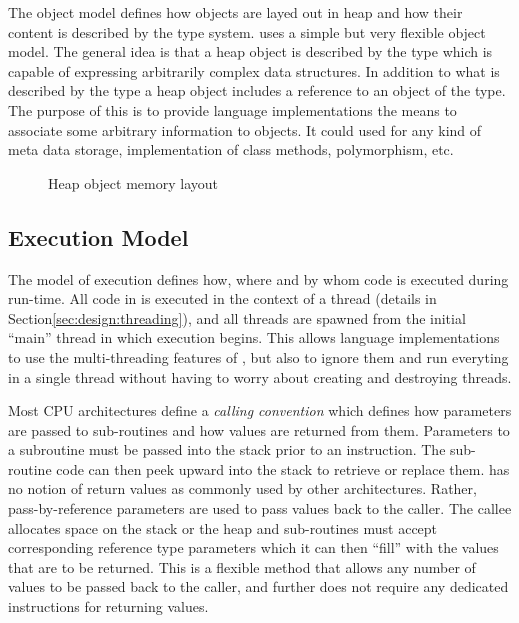 The object model defines how objects are layed out in heap and how their content
is described by the type system. \thename{} uses a simple but very flexible
object model. The general idea is that a heap object is described by the
 type which is capable of expressing arbitrarily complex data
structures. In addition to what is described by the type a heap object includes
a reference to an object of the  type. The purpose of this is to
provide language implementations the means to associate some arbitrary
information to objects. It could used for any kind of meta data storage,
implementation of class methods, polymorphism, etc.

\begin{figure}[H]
  \centering
  
  \caption{Heap object memory layout}
  \label{fig:design:heap-object-layout}
\end{figure}

\subsection{Execution Model}
The model of execution defines how, where and by whom code is executed during
run-time. All code in \thename{} is executed in the context of a thread (details
in Section\ref{sec:design:threading}), and all threads are spawned from the
initial ``main'' thread in which execution begins. This allows language
implementations to use the multi-threading features of \thename{}, but also to
ignore them and run everyting in a single thread without having to worry about
creating and destroying threads.

Most CPU architectures define a \emph{calling convention} which defines how
parameters are passed to sub-routines and how values are returned from
them. Parameters to a subroutine must be passed into the stack prior to an
 instruction. The sub-routine code can then peek upward into the
stack to retrieve or replace them. \thename{} has no notion of return values as
commonly used by other architectures. Rather, pass-by-reference parameters are
used to pass values back to the caller. The callee allocates space on the stack
or the heap and sub-routines must accept corresponding reference type parameters
which it can then ``fill'' with the values that are to be returned. This is a
flexible method that allows any number of values to be passed back to the
caller, and further does not require any dedicated instructions for returning
values.

